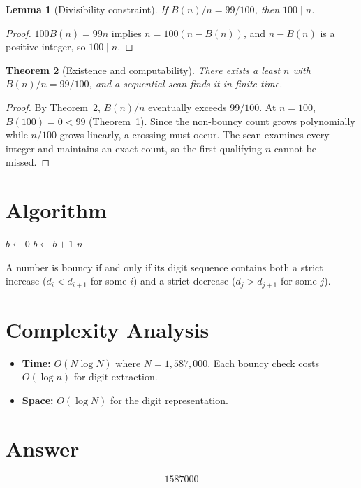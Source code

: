 \documentclass[12pt]{article}
\newtheorem{theorem}{Theorem}
\newtheorem{lemma}[theorem]{Lemma}
\begin{document}
\begin{lemma}[Divisibility constraint]
If $B(n)/n = 99/100$, then $100 \mid n$.
\end{lemma}

\begin{proof}
$100 B(n) = 99n$ implies $n = 100(n - B(n))$, and $n - B(n)$ is a positive integer, so $100 \mid n$.
\end{proof}

\begin{theorem}[Existence and computability]
There exists a least $n$ with $B(n)/n = 99/100$, and a sequential scan finds it in finite time.
\end{theorem}

\begin{proof}
By Theorem~2, $B(n)/n$ eventually exceeds $99/100$. At $n = 100$, $B(100) = 0 < 99$ (Theorem~1). Since the non-bouncy count grows polynomially while $n/100$ grows linearly, a crossing must occur. The scan examines every integer and maintains an exact count, so the first qualifying $n$ cannot be missed.
\end{proof}

\section{Algorithm}

\begin{algorithm}[H]
\caption{Find least $n$ with $B(n)/n = 99/100$}
\begin{algorithmic}[1]
\State $b \gets 0$
        \State $b \gets b + 1$
    \EndIf
        \State \Return $n$
    \EndIf
\EndFor
\end{algorithmic}
\end{algorithm}

A number is bouncy if and only if its digit sequence contains both a strict increase ($d_i < d_{i+1}$ for some $i$) and a strict decrease ($d_j > d_{j+1}$ for some $j$).

\section{Complexity Analysis}

\begin{itemize}
\item \textbf{Time:} $O(N \log N)$ where $N = 1{,}587{,}000$. Each bouncy check costs $O(\log n)$ for digit extraction.
\item \textbf{Space:} $O(\log N)$ for the digit representation.
\end{itemize}

\section{Answer}

\[
\boxed{1587000}
\]
\end{document}
